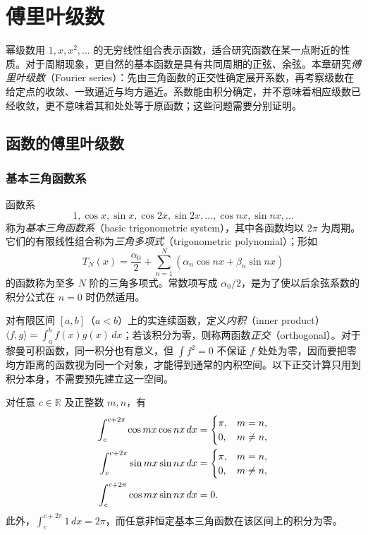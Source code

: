 \setcounter{chapter}{11} %
\chapter{傅里叶级数}
\label{chap:fourier-series}

幂级数用 $1,x,x^2,\ldots$ 的无穷线性组合表示函数，适合研究函数在某一点附近的性质。对于周期现象，更自然的基本函数是具有共同周期的正弦、余弦。本章研究\emph{傅里叶级数}（Fourier series）：先由三角函数的正交性确定展开系数，再考察级数在给定点的收敛、一致逼近与均方逼近。系数能由积分确定，并不意味着相应级数已经收敛，更不意味着其和处处等于原函数；这些问题需要分别证明。

\section{函数的傅里叶级数}
\label{sec:fourier-series-of-functions}

\subsection{基本三角函数系}
\label{subsec:basic-trigonometric-system}

函数系
\[
    1,\cos x,\sin x,\cos2x,\sin2x,\ldots,\cos nx,\sin nx,\ldots
\]
称为\emph{基本三角函数系}（basic trigonometric system），其中各函数均以 $2\pi$ 为周期。它们的有限线性组合称为\emph{三角多项式}（trigonometric polynomial）；形如
\[
    T_N(x)=\frac{\alpha_0}{2}
      +\sum_{n=1}^N(\alpha_n\cos nx+\beta_n\sin nx)
\]
的函数称为至多 $N$ 阶的三角多项式。常数项写成 $\alpha_0/2$，是为了使以后余弦系数的积分公式在 $n=0$ 时仍然适用。

对有限区间 $[a,b]$（$a<b$）上的实连续函数，定义\emph{内积}（inner product）$\langle f,g\rangle=\int_a^bf(x)g(x)\,dx$；若该积分为零，则称两函数\emph{正交}（orthogonal）。对于黎曼可积函数，同一积分也有意义，但 $\int f^2=0$ 不保证 $f$ 处处为零，因而要把零均方距离的函数视为同一个对象，才能得到通常的内积空间。以下正交计算只用到积分本身，不需要预先建立这一空间。

\begin{proposition}[基本三角函数系的正交关系]
\label{prop:trigonometric-orthogonality}
对任意 $c\in\mathbb R$ 及正整数 $m,n$，有
\begin{align}
    \int_c^{c+2\pi}\cos mx\cos nx\,dx
       &=\begin{cases}\pi,&m=n,\\0,&m\neq n,\end{cases}\notag\\
    \int_c^{c+2\pi}\sin mx\sin nx\,dx
       &=\begin{cases}\pi,&m=n,\\0,&m\neq n,\end{cases}\notag\\
    \int_c^{c+2\pi}\cos mx\sin nx\,dx&=0.
    \label{eq:trigonometric-orthogonality}
\end{align}
此外，$\int_c^{c+2\pi}1\,dx=2\pi$，而任意非恒定基本三角函数在该区间上的积分为零。
\end{proposition}

